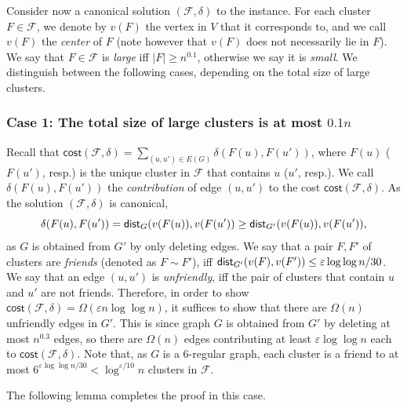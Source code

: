 \documentclass[11pt]{article}
\theoremstyle{definition}
\newcommand{\fset}{{\mathcal{F}}}
\newcommand{\eps}{{\varepsilon}}
\newcommand{\dist}{\textnormal{\textsf{dist}}}
\newcommand\vol{\mathsf{cost}}
\newcounter{note}
\begin{document}
Consider now a canonical solution $(\fset,\delta)$ to the instance. For each cluster $F\in \fset$, we denote by $v(F)$ the vertex in $V$ that it corresponds to, and we call $v(F)$ the \emph{center} of $F$ (note however that $v(F)$ does not necessarily lie in $F$). We say that $F\in \fset$ is \emph{large} iff $|F|\ge n^{0.1}$, otherwise we say it is \emph{small}. 
We distinguish between the following cases, depending on the total size of large clusters.
%

\subsubsection*{Case 1: The total size of large clusters is at most $0.1n$}

Recall that $\vol(\fset,\delta)=\sum_{(u,u')\in E(G)}\delta(F(u),F(u'))$, where $F(u)$ ($F(u')$, resp.) is the unique cluster in $\fset$ that contains $u$ ($u'$, resp.). We call $\delta(F(u),F(u'))$ the \emph{contribution} of edge $(u,u')$ to the cost $\vol(\fset,\delta)$.
As the solution $(\fset,\delta)$ is canonical, \[\delta(F(u),F(u'))=\dist_G(v(F(u)),v(F(u'))\ge \dist_{G'}(v(F(u)),v(F(u')),\] 
as $G$ is obtained from $G'$ by only deleting edges.
We say that a pair $F,F'$ of clusters are \emph{friends} (denoted as $F\sim F'$), iff $\dist_{G'}(v(F),v(F'))\le \eps \log \log n/30$.
We say that an edge $(u,u')$ is \emph{unfriendly}, iff the pair of clusters that contain $u$ and $u'$ are not friends.
Therefore, in order to show $\vol(\fset,\delta)=\Omega(\eps n\log\log n)$, it suffices to show that there are $\Omega(n)$ unfriendly edges in $G'$. This is since graph $G$ is obtained from $G'$ by deleting at most $n^{0.3}$ edges, so there are $\Omega(n)$ edges contributing at least $\eps \log\log n$ each to $\vol(\fset,\delta)$.
Note that, as $G$ is a $6$-regular graph, each cluster is a friend to at most $6^{\eps \log \log n/30}<\log^{\eps/10} n$ clusters in $\fset$.

The following lemma completes the proof in this case.


\end{document}
